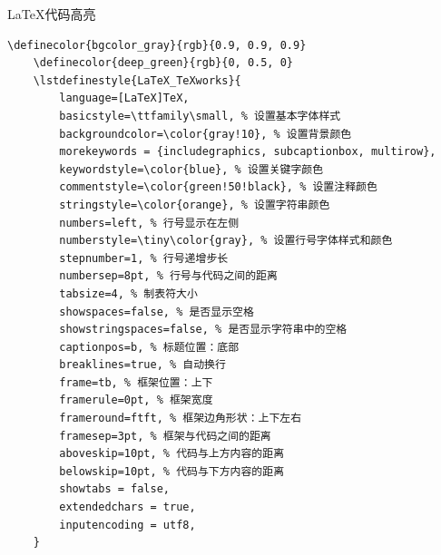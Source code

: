 \begin{enumerate}
\LaTeX 代码高亮\\
	\begin{lstlisting}[style = LaTeX_TeXworks]
	\definecolor{bgcolor_gray}{rgb}{0.9, 0.9, 0.9}
	\definecolor{deep_green}{rgb}{0, 0.5, 0}
	\lstdefinestyle{LaTeX_TeXworks}{
		language=[LaTeX]TeX,
		basicstyle=\ttfamily\small, % 设置基本字体样式
		backgroundcolor=\color{gray!10}, % 设置背景颜色
		morekeywords = {includegraphics, subcaptionbox, multirow},
		keywordstyle=\color{blue}, % 设置关键字颜色
		commentstyle=\color{green!50!black}, % 设置注释颜色
		stringstyle=\color{orange}, % 设置字符串颜色
		numbers=left, % 行号显示在左侧
		numberstyle=\tiny\color{gray}, % 设置行号字体样式和颜色
		stepnumber=1, % 行号递增步长
		numbersep=8pt, % 行号与代码之间的距离
		tabsize=4, % 制表符大小
		showspaces=false, % 是否显示空格
		showstringspaces=false, % 是否显示字符串中的空格
		captionpos=b, % 标题位置：底部
		breaklines=true, % 自动换行
		frame=tb, % 框架位置：上下
		framerule=0pt, % 框架宽度
		frameround=ftft, % 框架边角形状：上下左右
		framesep=3pt, % 框架与代码之间的距离
		aboveskip=10pt, % 代码与上方内容的距离
		belowskip=10pt, % 代码与下方内容的距离
		showtabs = false,
		extendedchars = true,
		inputencoding = utf8,	
	}	
	\end{lstlisting}
	

\end{enumerate}
